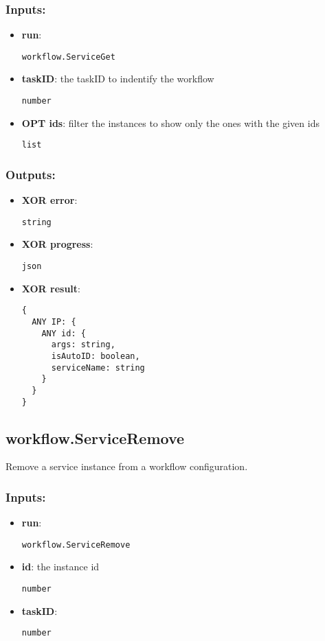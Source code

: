 \subsubsection*{Inputs:}
\begin{itemize}
  \small
    \item \textbf{run}: 
\begin{lstlisting}
workflow.ServiceGet
\end{lstlisting}
    \item \textbf{taskID}: the taskID to indentify the workflow
\begin{lstlisting}
number
\end{lstlisting}
    \item \textbf{OPT ids}: filter the instances to show only the ones with the given ids
\begin{lstlisting}
list
\end{lstlisting}
  \end{itemize}
\subsubsection*{Outputs:}
\begin{itemize}
  \small
    \item \textbf{XOR error}: 
\begin{lstlisting}
string
\end{lstlisting}
    \item \textbf{XOR progress}: 
\begin{lstlisting}
json
\end{lstlisting}
    \item \textbf{XOR result}: 
\begin{lstlisting}
{
  ANY IP: {
    ANY id: {
      args: string, 
      isAutoID: boolean, 
      serviceName: string
    }
  }
}
\end{lstlisting}
  \end{itemize}

\subsection{workflow.ServiceRemove}
\label{ch:builtinservices:workflow.ServiceRemove}
Remove a service instance from a workflow configuration.
\subsubsection*{Inputs:}
\begin{itemize}
  \small
    \item \textbf{run}: 
\begin{lstlisting}
workflow.ServiceRemove
\end{lstlisting}
    \item \textbf{id}: the instance id
\begin{lstlisting}
number
\end{lstlisting}
    \item \textbf{taskID}: 
\begin{lstlisting}
number
\end{lstlisting}
  \end{itemize}
